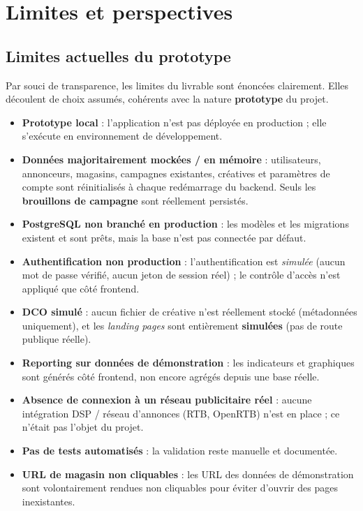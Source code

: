 \chapter{Limites et perspectives}

\section{Limites actuelles du prototype}

Par souci de transparence, les limites du livrable sont énoncées clairement.
Elles découlent de choix assumés, cohérents avec la nature \textbf{prototype}
du projet.

\begin{itemize}
  \item \textbf{Prototype local} : l'application n'est pas déployée en
        production ; elle s'exécute en environnement de développement.
  \item \textbf{Données majoritairement mockées / en mémoire} :
        utilisateurs, annonceurs, magasins, campagnes existantes, créatives et
        paramètres de compte sont réinitialisés à chaque redémarrage du
        backend. Seuls les \textbf{brouillons de campagne} sont réellement
        persistés.
  \item \textbf{PostgreSQL non branché en production} : les modèles et les
        migrations existent et sont prêts, mais la base n'est pas connectée
        par défaut.
  \item \textbf{Authentification non \og production \fg{}} : l'authentification
        est \emph{simulée} (aucun mot de passe vérifié, aucun jeton de session
        réel) ; le contrôle d'accès n'est appliqué que côté frontend.
  \item \textbf{DCO simulé} : aucun fichier de créative n'est réellement stocké
        (métadonnées uniquement), et les \emph{landing pages} sont entièrement
        \textbf{simulées} (pas de route publique réelle).
  \item \textbf{Reporting sur données de démonstration} : les indicateurs et
        graphiques sont générés côté frontend, non encore agrégés depuis une
        base réelle.
  \item \textbf{Absence de connexion à un réseau publicitaire réel} : aucune
        intégration DSP / réseau d'annonces (RTB, OpenRTB) n'est en place ;
        ce n'était pas l'objet du projet.
  \item \textbf{Pas de tests automatisés} : la validation reste manuelle et
        documentée.
  \item \textbf{URL de magasin non cliquables} : les URL des données de
        démonstration sont volontairement rendues non cliquables pour éviter
        d'ouvrir des pages inexistantes.
\end{itemize}


